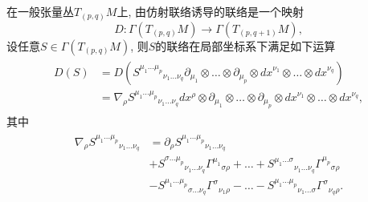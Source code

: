 \begin{definition}
  在一般张量丛$T_{(p, q)}M$上, 由仿射联络诱导的联络是一个映射
  $$D:\varGamma(T_{(p, q)}M)\rightarrow\varGamma(T_{(p, q+1)}M), $$
  设任意$S\in \varGamma(T_{(p, q)}M)$, 则$S$的联络在局部坐标系下满足如下运算
  \begin{eqnarray}
    \begin{aligned}
      D(S)&=D({S^{\mu_1\dots\mu_p}}_{\nu_1\dots\nu_q}\partial_{\mu_1}\otimes\dots\otimes\partial_{\mu_p}\otimes{dx}^{\nu_1}\otimes\dots\otimes{dx}^{\nu_q})\\
      &=\nabla_{\rho}{S^{\mu_1\dots\mu_p}}_{\nu_1\dots\nu_q}dx^\rho\otimes\partial_{\mu_1}\otimes\dots\otimes\partial_{\mu_p}\otimes{dx}^{\nu_1}\otimes\dots\otimes{dx}^{\nu_q},
    \end{aligned}
  \end{eqnarray}
  其中
  \begin{eqnarray}\begin{aligned}
      \nabla_{\rho}{S^{\mu_1\dots\mu_p}}_{\nu_1\dots\nu_q}&=\partial_\rho{S^{\mu_1\dots\mu_p}}_{\nu_1\dots\nu_q}\\
      &+{S^{\sigma\dots\mu_p}}_{\nu_1\dots\nu_q}{\varGamma^{\mu_1}}_{\sigma\rho}+\dots+{S^{\mu_1\dots\sigma}}_{\nu_1\dots\nu_q}{\varGamma^{\mu_p}}_{\sigma\rho}\\
      &-{S^{\mu_1\dots\mu_p}}_{\sigma\dots\nu_q}{\varGamma^{\sigma}}_{\nu_1\rho}-\dots-{S^{\mu_1\dots\mu_p}}_{\nu_1\dots\sigma}{\varGamma^{\sigma}}_{\nu_q\rho}.
  \end{aligned}\end{eqnarray}
\end{definition}
